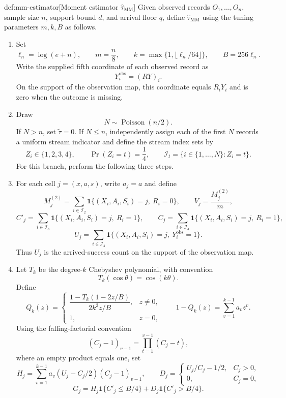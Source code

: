 \begin{algorithmv}{def:mm-estimator}[Moment estimator $\widehat\tau_{\mathrm{MM}}$]
Given observed records \(O_1,\ldots,O_n\), sample size \(n\), support bound \(d\), and arrival floor \(q\), define \(\widehat\tau_{\mathrm{MM}}\) using the tuning parameters \(m,k,B\) as follows.
\begin{enumerate}
\item Set
\[
\ell_n=\log(e+n),\qquad
m=\frac n8,\qquad
k=\max\{1,\lfloor\ell_n/64\rfloor\},\qquad
B=256\ell_n.
\]
Write the supplied fifth coordinate of each observed record as
\[
Y_i^{\mathrm{obs}}=(RY)_i.
\]
On the support of the observation map, this coordinate equals \(R_iY_i\) and is zero when the outcome is missing.

\item Draw
\[
N\sim\operatorname{Poisson}(n/2).
\]
If \(N>n\), set \(\widetilde\tau=0\). If \(N\le n\), independently assign each of the first \(N\) records a uniform stream indicator and define the stream index sets by
\[
Z_i\in\{1,2,3,4\},\qquad
\Pr(Z_i=t)=\frac14,\qquad
\mathcal I_t=\{i\in\{1,\ldots,N\}:Z_i=t\}.
\]
For this branch, perform the following three steps.

\item For each cell \(j=(x,a,s)\), write \(a_j=a\) and define
\[
M_j^{(2)}
=\sum_{i\in\mathcal I_2}
\mathbf 1\{(X_i,A_i,S_i)=j,\ R_i=0\},
\qquad
V_j=\frac{M_j^{(2)}}m,
\]
\[
C'_j
=\sum_{i\in\mathcal I_3}
\mathbf 1\{(X_i,A_i,S_i)=j,\ R_i=1\},
\qquad
C_j
=\sum_{i\in\mathcal I_4}
\mathbf 1\{(X_i,A_i,S_i)=j,\ R_i=1\},
\]
\[
U_j
=\sum_{i\in\mathcal I_4}
\mathbf 1\{(X_i,A_i,S_i)=j,\ Y_i^{\mathrm{obs}}=1\}.
\]
Thus \(U_j\) is the arrived-success count on the support of the observation map.

\item Let \(T_k\) be the degree-\(k\) Chebyshev polynomial, with convention
\[
T_k(\cos\theta)=\cos(k\theta).
\]
Define
\[
Q_k(z)=
\begin{cases}
\dfrac{1-T_k(1-2z/B)}{2k^2z/B},&z\ne0,\\[6pt]
1,&z=0,
\end{cases}
\qquad
1-Q_k(z)=\sum_{v=1}^{k-1}a_vz^v.
\]
Using the falling-factorial convention
\[
(C_j-1)_{v-1}=\prod_{t=1}^{v-1}(C_j-t),
\]
where an empty product equals one, set
\[
H_j=\sum_{v=1}^{k-1}a_v(U_j-C_j/2)(C_j-1)_{v-1},
\qquad
D_j=
\begin{cases}
U_j/C_j-1/2,&C_j>0,\\
0,&C_j=0,
\end{cases}
\]
\[
G_j
=H_j\mathbf 1\{C'_j\le B/4\}
+D_j\mathbf 1\{C'_j>B/4\}.
\]


\end{enumerate}
\end{algorithmv}
